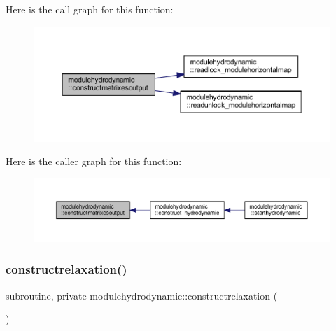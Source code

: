 Here is the call graph for this function\+:\nopagebreak
\begin{figure}[H]
\begin{center}
\leavevmode
\includegraphics[width=350pt]{namespacemodulehydrodynamic_a40ae80918927a7eb25c954cec3bd2b40_cgraph}
\end{center}
\end{figure}
Here is the caller graph for this function\+:\nopagebreak
\begin{figure}[H]
\begin{center}
\leavevmode
\includegraphics[width=350pt]{namespacemodulehydrodynamic_a40ae80918927a7eb25c954cec3bd2b40_icgraph}
\end{center}
\end{figure}
\mbox{\label{namespacemodulehydrodynamic_ac37871a130f9232cb11f29fc34327f44}} 
\subsubsection{\texorpdfstring{constructrelaxation()}{constructrelaxation()}}
{\footnotesize\ttfamily subroutine, private modulehydrodynamic\+::constructrelaxation (\begin{DoxyParamCaption}{ }\end{DoxyParamCaption})\hspace{0.3cm}{\ttfamily [private]}}

